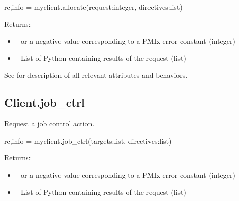 \format

\pyspecificstart
\begin{codepar}
rc,info = myclient.allocate(request:integer, directives:list)
\end{codepar}
\pyspecificend

\begin{arglist}
\end{arglist}

Returns:

\begin{itemize}
    \item {} -  or a negative value corresponding to a PMIx error constant (integer)
    \item {} - List of Python  containing results of the request (list)
\end{itemize}

See  for description of all relevant attributes and behaviors.


\subsection{Client.job_ctrl}

\summary

Request a job control action.

\format

\pyspecificstart
\begin{codepar}
rc,info = myclient.job_ctrl(targets:list, directives:list)
\end{codepar}
\pyspecificend

\begin{arglist}
\end{arglist}

Returns:

\begin{itemize}
    \item {} -  or a negative value corresponding to a PMIx error constant (integer)
    \item {} - List of Python  containing results of the request (list)
\end{itemize}

